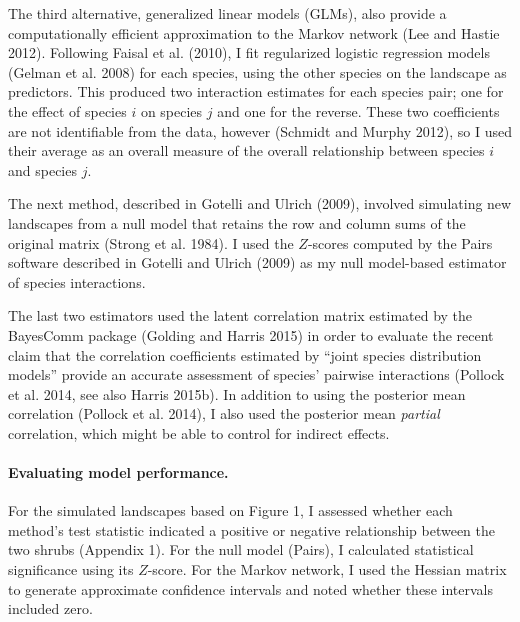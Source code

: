 \documentclass[12pt,]{article}
\begin{document}
\begin{spacing}{1.9}
\begin{flushleft}
The third alternative, generalized linear models (GLMs), also provide a
computationally efficient approximation to the Markov network (Lee and
Hastie 2012). Following Faisal et al. (2010), I fit regularized logistic
regression models (Gelman et al. 2008) for each species, using the other
species on the landscape as predictors. This produced two interaction
estimates for each species pair; one for the effect of species \(i\) on
species \(j\) and one for the reverse. These two coefficients are not
identifiable from the data, however (Schmidt and Murphy 2012), so I used
their average as an overall measure of the overall relationship between
species \(i\) and species \(j\).

The next method, described in Gotelli and Ulrich (2009), involved
simulating new landscapes from a null model that retains the row and
column sums of the original matrix (Strong et al. 1984). I used the
\(Z\)-scores computed by the Pairs software described in Gotelli and
Ulrich (2009) as my null model-based estimator of species interactions.

The last two estimators used the latent correlation matrix estimated by
the BayesComm package (Golding and Harris 2015) in order to evaluate the
recent claim that the correlation coefficients estimated by ``joint
species distribution models'' provide an accurate assessment of species'
pairwise interactions (Pollock et al. 2014, see also Harris 2015b). In
addition to using the posterior mean correlation (Pollock et al. 2014),
I also used the posterior mean \emph{partial} correlation, which might
be able to control for indirect effects.

\paragraph{Evaluating model
performance.}\label{evaluating-model-performance.}

For the simulated landscapes based on Figure 1, I assessed whether each
method's test statistic indicated a positive or negative relationship
between the two shrubs (Appendix 1). For the null model (Pairs), I
calculated statistical significance using its \(Z\)-score. For the
Markov network, I used the Hessian matrix to generate approximate
confidence intervals and noted whether these intervals included zero.


\end{flushleft}
\end{spacing}
\end{document}
